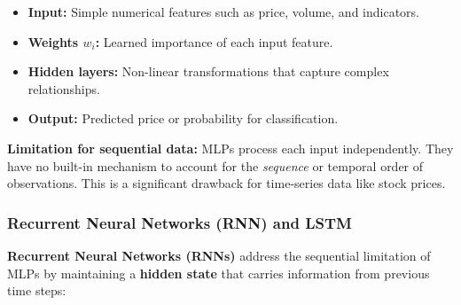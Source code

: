\documentclass[12pt,openany]{book}
\begin{document}
\begin{itemize}[leftmargin=*]
    \item \textbf{Input:} Simple numerical features such as price, volume, and indicators.
    \item \textbf{Weights \(w_i\):} Learned importance of each input feature.
    \item \textbf{Hidden layers:} Non-linear transformations that capture complex relationships.
    \item \textbf{Output:} Predicted price or probability for classification.
\end{itemize}

\textbf{Limitation for sequential data:} MLPs process each input independently. They have no built-in mechanism to account for the \textit{sequence} or temporal order of observations. This is a significant drawback for time-series data like stock prices.

\subsubsection{Recurrent Neural Networks (RNN) and LSTM}

\textbf{Recurrent Neural Networks (RNNs)} address the sequential limitation of MLPs by maintaining a \textbf{hidden state} that carries information from previous time steps:

\begin{center}
\end{center}
\end{document}
